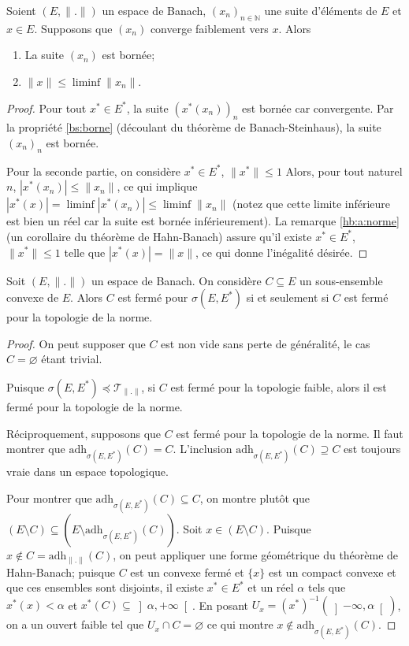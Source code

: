 \begin{prop}
  Soient $(E, \|.\|)$ un espace de Banach, $(x_n)_{n\in\mathbb N}$ une suite
  d'éléments de $E$ et $x\in E$. Supposons que $(x_n)$ converge faiblement
  vers $x$.
  Alors
  \begin{enumerate}
  \item La suite $(x_n)$ est bornée;
  \item $\|x\|\leq\liminf\|x_n\|$.
  \end{enumerate}
\end{prop}
\begin{proof}
  Pour tout $x^*\in E^*$, la suite $(x^*(x_n))_n$ est bornée car convergente.
  Par la propriété \ref{bs:borne} (découlant du théorème de Banach-Steinhaus),
  la suite $(x_n)_n$ est bornée.

  Pour la seconde partie, on considère $x^*\in E^*$, $\|x^*\|\leq 1$
  Alors, pour tout naturel $n$, $|x^*(x_n)|\leq \|x_n\|$, ce qui
  implique $|x^*(x)| = \liminf|x^*(x_n)| \leq \liminf \|x_n\|$ (notez que
  cette limite inférieure est bien un réel car la suite est
  bornée inférieurement).
  La remarque \ref{hb:a:norme} (un corollaire du théorème de Hahn-Banach)
  assure qu'il existe $x^*\in E^*$, $\|x^*\|\leq 1$ telle que
  $|x^*(x)| = \|x\|$, ce qui donne l'inégalité désirée.
\end{proof}

\begin{prop}
  Soit $(E, \|.\|)$ un espace de Banach. On considère $C\subseteq E$
  un sous-ensemble convexe de $E$. Alors
  $C$ est fermé pour $\sigma(E, E^*)$ si et seulement si $C$ est fermé
  pour la topologie de la norme.
\end{prop}
\begin{proof}
  On peut supposer que $C$ est non vide sans perte de généralité, le cas
  $C = \varnothing$ étant trivial.

  Puisque $\sigma(E, E^*)\preceq \mathcal T_{\|.\|}$, si $C$ est fermé
  pour la topologie faible, alors il est fermé pour la topologie de la norme.

  Réciproquement, supposons que $C$ est fermé pour la topologie de la
  norme. Il faut montrer que $\mathrm{adh}_{\sigma(E, E^*)}(C) = C$.
  L'inclusion $\mathrm{adh}_{\sigma(E, E^*)}(C) \supseteq C$ est toujours vraie
  dans un espace topologique.

  Pour montrer que $\mathrm{adh}_{\sigma(E, E^*)}(C)\subseteq C$, on
  montre plutôt que $(E\setminus C) \subseteq (E\setminus
  \mathrm{adh}_{\sigma(E, E^*)}(C))$. Soit $x\in (E\setminus C)$. Puisque
  $x\notin C = \mathrm{adh}_{\|.\|}(C)$, on peut appliquer une forme géométrique
  du théorème de Hahn-Banach; puisque $C$ est un convexe fermé et $\{x\}$
  est un compact convexe et que ces ensembles sont disjoints,
  il existe $x^*\in E^*$ et un réel $\alpha$
  tels que $x^*(x)< \alpha$ et $x^*(C)\subseteq \left]\alpha, +\infty\right[$.
  En posant $U_x = (x^*)^{-1}(\left]-\infty, \alpha\right[)$, on a un ouvert
  faible tel que $U_x\cap C = \varnothing$ ce qui montre
  $x\notin \mathrm{adh}_{\sigma(E, E^*)}(C)$.
\end{proof}

